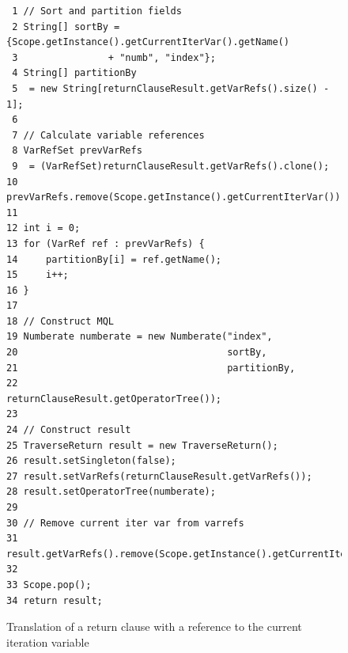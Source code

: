 \begin{figure}[!htp]
\begin{center}
\begin{Verbatim}
 1 // Sort and partition fields
 2 String[] sortBy = {Scope.getInstance().getCurrentIterVar().getName() 
 3 		          + "numb", "index"};
 4 String[] partitionBy 
 5 	= new String[returnClauseResult.getVarRefs().size() - 1];
 6 
 7 // Calculate variable references
 8 VarRefSet prevVarRefs 
 9 	= (VarRefSet)returnClauseResult.getVarRefs().clone();         
10 prevVarRefs.remove(Scope.getInstance().getCurrentIterVar());
11 
12 int i = 0;
13 for (VarRef ref : prevVarRefs) {
14     partitionBy[i] = ref.getName();
15     i++;
16 }
17 
18 // Construct MQL
19 Numberate numberate = new Numberate("index", 
20                                     sortBy, 
21                                     partitionBy, 
22                                     returnClauseResult.getOperatorTree());
23 
24 // Construct result
25 TraverseReturn result = new TraverseReturn();
26 result.setSingleton(false);
27 result.setVarRefs(returnClauseResult.getVarRefs());
28 result.setOperatorTree(numberate);
29 
30 // Remove current iter var from varrefs
31 result.getVarRefs().remove(Scope.getInstance().getCurrentIterVar());
32 
33 Scope.pop();
34 return result;
\end{Verbatim}
  \caption{Translation of a return clause with a reference to the current
  iteration variable}
  \label{fig:impl:td:for_return_withref}
\end{center}
\end{figure}


% 
% 
% 
% 
% 
% 

